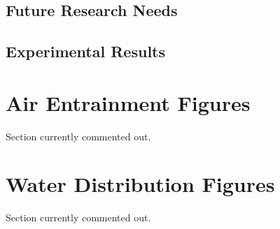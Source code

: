 \documentclass{article}
\begin{document}
\section{Future Research Needs}




\printbibliography

\clearpage

\begin{appendices}

\section{Experimental Results} \label{App:Results}
\renewcommand{\thesubsection}{\Alph{section}}

\appendix


\chapter{Air Entrainment Figures}
\label{app:Air_Entrainment_Figures}

Section currently commented out.

\chapter{Water Distribution Figures}
\label{app:Water_Distribution_Figures}

Section currently commented out.

\clearpage

\end{appendices}
\end{document}

